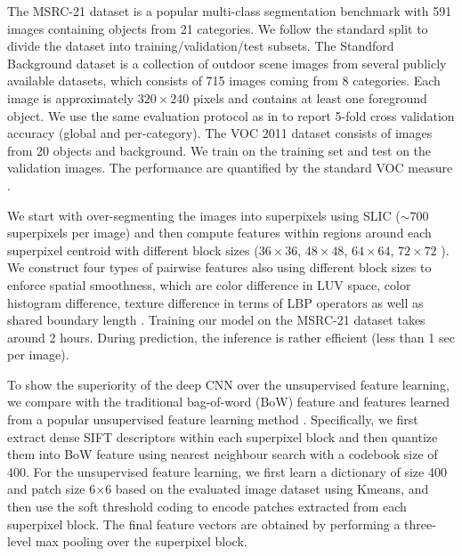 \documentclass[10pt,3p]{elsarticle}
\begin{document}
The MSRC-21 dataset \cite{Shotton08} is a popular multi-class segmentation benchmark with 591 images containing objects from 21 categories. We follow the standard split to divide the dataset into training/validation/test subsets. 
The Standford Background dataset \cite{Gould09} is a collection of outdoor scene images from several publicly available datasets,  which consists of 715 images coming from 8 categories. Each image is approximately $320 \times 240$ pixels and contains at least one foreground object. We use the same evaluation protocol as in \cite{Gould09} to report 5-fold cross validation accuracy (global and per-category).
The VOC 2011 dataset consists of images from 20 objects and background.
%
We train on the training set and test on the validation images. 
The performance are quantified by the standard VOC measure \cite{PascalVOC}.

We start with over-segmenting the images into superpixels using SLIC \cite{slic} ($\sim 700$ superpixels per image) and then compute features  within regions around each superpixel centroid with different block sizes ($36 \times 36$, $48 \times 48$, $64 \times 64$, $72 \times 72$ ). 
We construct four types of pairwise features also using different block sizes to enforce spatial smoothness, which are color difference in LUV space, color histogram difference, texture difference in terms of LBP operators as well as shared boundary length \cite{Fulkerson09}. 
Training our model on the MSRC-21 dataset takes around 2 hours.
During prediction, the inference is rather efficient (less than 1 sec per image).

To show the superiority of the deep CNN over the unsupervised feature learning, we compare with the traditional bag-of-word (BoW) feature and features learned from a popular unsupervised feature learning method \cite{Coates11}. Specifically, we first extract dense SIFT descriptors within each superpixel block and then quantize them into BoW feature using nearest neighbour search with a codebook size of 400. 
For the unsupervised feature learning, we first learn a dictionary of size 400 and patch size 6$\times$6 based on the evaluated image dataset using Kmeans, and then use the soft threshold coding \cite{Coates11}%
to encode patches extracted from each superpixel block. The final feature vectors are obtained by performing a three-level max pooling over the superpixel block. 
\end{document}
